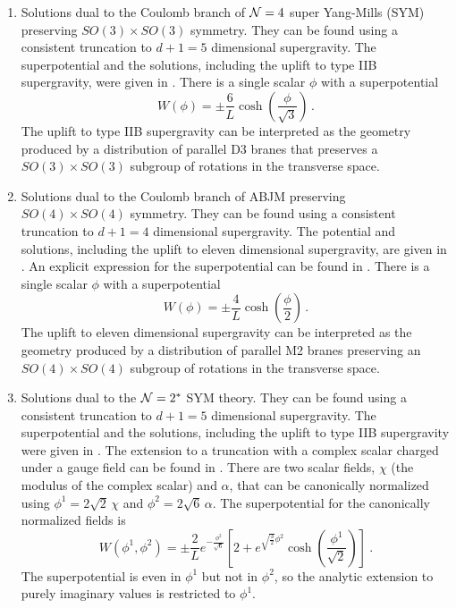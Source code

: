 \begin{enumerate}
\item Solutions dual to the Coulomb branch of ${\cal N}=4$ super Yang-Mills (SYM) preserving $SO(3)\times SO(3)$ symmetry. They can be found using a consistent truncation to $d+1=5$ dimensional supergravity. The superpotential and the solutions, including the uplift to type IIB supergravity, were given in \cite{Freedman:1999gk,Cvetic:1999xx}. There is a single scalar $\phi$ with a superpotential
\begin{equation}
	W(\phi)= \pm \frac{6}{L}\cosh\left(\frac{\phi}{\sqrt{3}}\right)\,.
\end{equation}
The uplift to type IIB supergravity can be interpreted as the geometry produced by a distribution of parallel D3 branes that preserves a $SO(3)\times SO(3)$ subgroup of rotations in the transverse space.

\item Solutions dual to the Coulomb branch of ABJM preserving $SO(4)\times SO(4)$ symmetry. They can be found using a consistent truncation to $d+1=4$ dimensional supergravity. The potential and solutions, including the uplift to eleven dimensional supergravity, are given in \cite{Cvetic:1999xx}. An explicit expression for the superpotential can be found in \eg \cite{Tarrio:2013qga}. There is a single scalar $\phi$ with a superpotential
\begin{equation}
	W(\phi)=\pm\frac{4}{L}\cosh \left(\frac{\phi}{2}\right)\,.
\end{equation}
The uplift to eleven dimensional supergravity can be interpreted as the geometry produced by a distribution of parallel M2 branes preserving an $SO(4)\times SO(4)$ subgroup of rotations in the transverse space.

\item Solutions dual to the ${\cal N}=2^*$ SYM theory. They can be found using a consistent truncation to $d+1=5$ dimensional supergravity. The superpotential and the solutions, including the uplift to type IIB supergravity were given in \cite{Pilch:2000ue}. The extension to a truncation with a complex scalar charged under a gauge field can be found in \cite{Bobev:2010de}. There are two scalar fields, $\chi$ (the modulus of the complex scalar) and $ \alpha$, that can be canonically normalized using $\phi^1=2\sqrt{2}\,\chi$  and $\phi^2= 2\sqrt{6}\,\alpha$. The superpotential for the canonically normalized fields is
\begin{equation}
	W(\phi^1,\phi^2)=\pm\frac{2}{L} e^{-\frac{\phi^2}{\sqrt{6}}} \left[2 + e^{\sqrt{\frac{3}{2}}\phi^2} \cosh\left(\frac{\phi^1}{\sqrt{2}}\right)\right]\ .
\end{equation}
The superpotential is even in $\phi^1$ but not in $\phi^2$, so the analytic extension to purely imaginary values is restricted to $\phi^1$. 


\end{enumerate}
